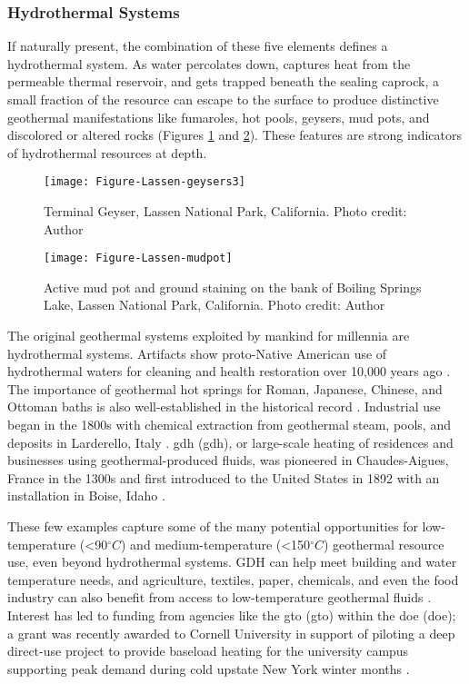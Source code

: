 \subsubsection{Hydrothermal Systems}\label{ch2:hydro}
If naturally present, the combination of these five elements defines a hydrothermal system. As water percolates down, captures heat from the permeable thermal reservoir, and gets trapped beneath the sealing caprock, a small fraction of the resource can escape to the surface to produce distinctive geothermal manifestations like fumaroles, hot pools, geysers, mud pots, and discolored or altered rocks (Figures \ref{fig:lassen-geysers} and \ref{fig:lassen-mudpot}). These features are strong indicators of hydrothermal resources at depth.
\begin{figure}[h!]
\centering
\texttt{[image: Figure-Lassen-geysers3]}
\caption[Terminal Geyser, Lassen National Park]{Terminal Geyser, Lassen National Park, California. Photo credit: Author}
\label{fig:lassen-geysers}
\end{figure}
\begin{figure}[htbp]
\centering
\texttt{[image: Figure-Lassen-mudpot]}
\caption[Mud pot, Lassen National Park]{Active mud pot and ground staining on the bank of Boiling Springs Lake, Lassen National Park, California. Photo credit: Author}
\label{fig:lassen-mudpot}
\end{figure}
The original geothermal systems exploited by mankind for millennia are hydrothermal systems. Artifacts show proto-Native American use of hydrothermal waters for cleaning and health restoration over 10,000 years ago \citep{doe_history_2021}. The importance of geothermal hot springs for Roman, Japanese, Chinese, and Ottoman baths is also well-established in the historical record \citep{lund_characteristics_2007}. Industrial use began in the 1800s with chemical extraction from geothermal steam, pools, and deposits in Larderello, Italy \citep[~p. 251]{dipippo_geothermal_2012}. \acrlong{gdh} (\acrshort{gdh}), or large-scale heating of residences and businesses using geothermal-produced fluids, was pioneered in Chaudes-Aigues, France in the 1300s and first introduced to the United States in 1892 with an installation in Boise, Idaho \citep{lund_characteristics_2007}.

These few examples capture some of the many potential opportunities for low-temperature (<90\(^\circ C\)) and medium-temperature (<150\(^\circ C\)) geothermal resource use, even beyond hydrothermal systems. GDH can help meet building and water temperature needs, and agriculture, textiles, paper, chemicals, and even the food industry can also benefit from access to low-temperature geothermal fluids \citep{doe_low_2021,liu_overview_2015}. Interest has led to funding from agencies like the \acrlong{gto} (\acrshort{gto}) within the \acrlong{doe} (\acrshort{doe}); a grant was recently awarded to Cornell University in support of piloting a deep direct-use project to provide baseload heating for the university campus supporting peak demand during cold upstate New York winter months  \citep{hamm_geothermal_2021,tester_integrating_2015}.


